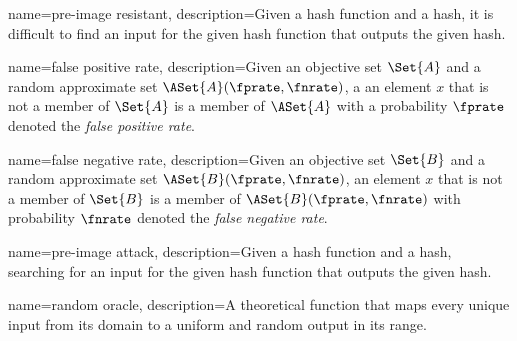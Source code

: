 {
    name={pre-image resistant},
    description={Given a hash function and a hash, it is difficult to find an
    input for the given hash function that outputs the given hash.}
}

{
    name={false positive rate},
    description={Given an objective set $\Set{A}$ and a random approximate set
    $\ASet{A}(\fprate,\fnrate)$, a an element $x$ that is not a member of
    $\Set{A}$ is a member of $\ASet{A}$ with a probability $\fprate$ denoted the
    \emph{false positive rate}}.
}

{
    name={false negative rate},
    description={Given an objective set $\Set{B}$ and a random approximate set
    $\ASet{B}(\fprate,\fnrate)$, an element $x$ that is not a member of
    $\Set{B}$ is a member of $\ASet{B}(\fprate,\fnrate)$ with probability
    $\fnrate$ denoted the \emph{false negative rate}}.
}

{
    name={pre-image attack},
    description={Given a hash function and a hash, searching for an input for
    the given hash function that outputs the given hash.}
}

{
    name={random oracle},
    description={A theoretical function that maps every unique input from its
    domain to a uniform and random output in its range.}
}

